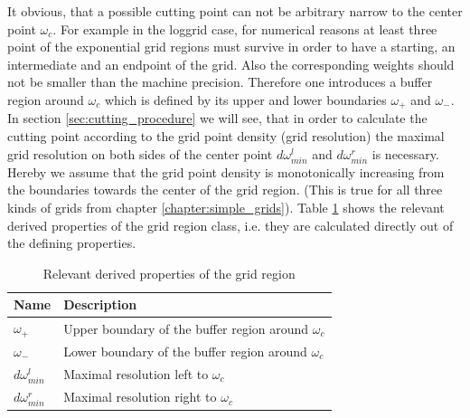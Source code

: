 It obvious, that a possible cutting point can not be arbitrary narrow to the center point $\omega_c$. For example in the loggrid case, for numerical reasons at least three point of the exponential grid regions must survive in order to have a starting, an intermediate and an endpoint of the grid. Also the corresponding weights should not be smaller than the machine precision. Therefore one introduces a buffer region around $\omega_c$ which is defined by its upper and lower boundaries $\omega_+$ and $\omega_-$. In section \ref{sec:cutting_procedure} we will see, that in order to calculate the cutting point according to the grid point density (grid resolution) the maximal grid resolution on both sides of the center point $d\omega_{min}^l$ and $d\omega_{min}^r$ is necessary. Hereby we assume that the grid point density is monotonically increasing from the boundaries towards the center of the grid region. (This is true for all three kinds of grids from chapter \ref{chapter:simple_grids}). Table \ref{tab:grid_region_derived_members} shows the relevant derived properties of the grid region class, i.e. they are calculated directly out of the defining properties.
\begin{table}[h]
	\begin{center}
		\begin{tabular}{ll}
		Name & Description \\ 
		\hline
		$\omega_+$  & Upper boundary of the buffer region around $\omega_c$ \\
		$\omega_-$  & Lower boundary of the buffer region around $\omega_c$ \\
		$d\omega_{min}^l$  & Maximal resolution left to $\omega_c$ \\
		$d\omega_{min}^r$  & Maximal resolution right to $\omega_c$ \\
		\end{tabular}
	\end{center}
	\caption{Relevant derived properties of the grid region}
	\label{tab:grid_region_derived_members}
\end{table}

